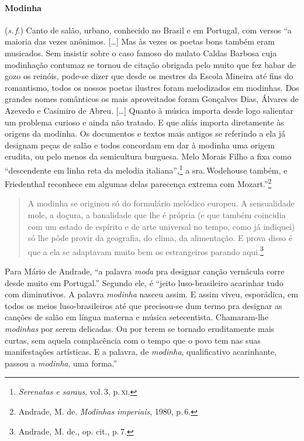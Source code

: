 \paragraph{Modinha} (\textit{s.\,f.}) Canto de salão, urbano, conhecido no Brasil e
em Portugal, com versos ``a maioria das vezes anônimos. {[}\ldots{}{]} Mas às
vezes os poetas bons também eram musicados. Sem insistir sobre o caso
famoso do mulato Caldas Barbosa cuja modinhação contumaz se tornou de
citação obrigada pelo muito que fez babar de gozo os reinóis, pode-se
dizer que desde os mestres da Escola Mineira até fins do romantismo,
todos os nossos poetas ilustres foram melodizados em modinhas. Dos
grandes nomes românticos os mais aproveitados foram Gonçalves Dias,
Álvares de Azevedo e Casimiro de Abreu. {[}\ldots{}{]} Quanto à música importa
desde logo salientar um problema curioso e ainda não tratado. E que
aliás importa diretamente às origens da modinha. Os documentos e textos
mais antigos se referindo a ela já designam peças de salão e todos
concordam em dar à modinha uma origem erudita, ou pelo menos da
semicultura burguesa. Melo Morais Filho a fixa como ``descendente em
linha reta da melodia italiana'',\footnote{\textit{Serenatas e saraus}, vol.\,3, p.\,\textsc{xi}.} a sra.\,Wodehouse também, e Friedenthal reconhece em algumas delas
parecença extrema com Mozart.''\footnote{Andrade, M. de. \textit{Modinhas
imperiais}, 1980, p.\,6.}

\begin{quote}
\small{A modinha se originou só do formulário melódico europeu. A sensualidade
mole, a doçura, a banalidade que lhe é própria (e que também coincidia
com um estado de espírito e de arte universal no tempo, como já
indiquei) só lhe pôde provir da geografia, do clima, da alimentação. E
prova disso é que a ela se adaptavam muito bem os estrangeiros parando
aqui.}\footnote{Andrade, M. de., op. cit., p.\,7.}
\end{quote}

Para Mário de Andrade, ``a palavra \textit{moda} pra designar canção vernácula
corre desde muito em Portugal.'' Segundo ele, é ``jeito luso-brasileiro
acarinhar tudo com diminutivos. A palavra \textit{modinha} nasceu assim. E assim
viveu, esporádica, em todos os meios luso-brasileiros até que
precisou-se dum termo pra designar as canções de salão em língua materna
e música setecentista. Chamaram-lhe \textit{modinhas} por serem delicadas. Ou por
terem se tornado eruditamente mais curtas, sem aquela complacência com o
tempo que o povo tem nas suas manifestações artísticas. E a palavra, de
\textit{modinha}, qualificativo acarinhante, passou a \textit{modinha}, uma forma.''

